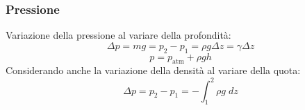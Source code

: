 \hypertarget{pressione}{%
\subsubsection{Pressione}\label{pressione}}

Variazione della pressione al variare della profondità:
\[\Delta p=mg=p_2-p_1=\rho g\Delta z=\gamma\Delta z\]
\[p=p_\text{atm}+\rho gh\] Considerando anche la variazione della
densità al variare della quota: \[\Delta p=p_2-p_1=-\int_1^2\rho g\;dz\]
